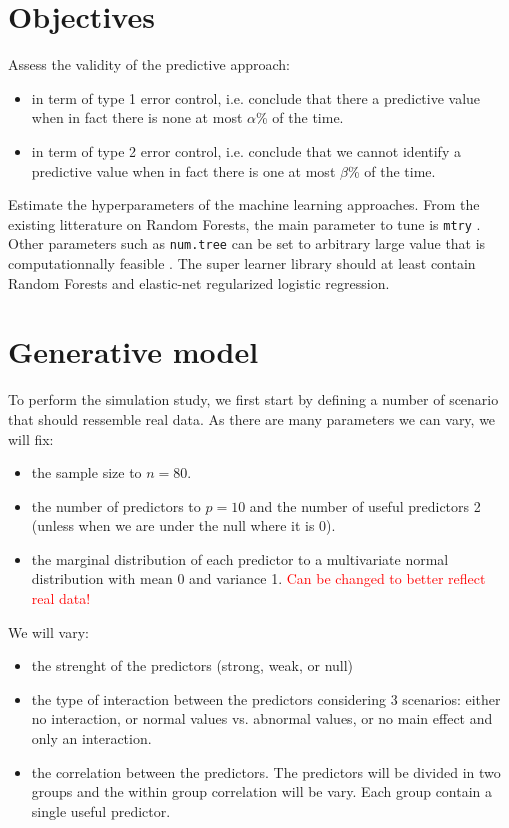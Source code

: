 \documentclass[12pt]{article}
\begin{document}
\section{Objectives}
\label{sec:org1970248}

Assess the validity of the predictive approach:
\begin{itemize}
\item in term of type 1 error control, i.e. conclude that there a predictive
value when in fact there is none at most \(\alpha\)\% of the time.
\item in term of type 2 error control, i.e. conclude that we cannot identify a predictive
value when in fact there is one at most \(\beta\)\% of the time.
\end{itemize}

\bigskip

Estimate the hyperparameters of the machine learning
approaches. \newline From the existing litterature on Random Forests,
the main parameter to tune is \texttt{mtry}
\cite{probst2019hyperparameters}. Other parameters such as \texttt{num.tree}
can be set to arbitrary large value that is computationnally feasible
\citep{probst2017tune}.  \newline The super learner library should at
least contain Random Forests and elastic-net regularized logistic
regression.

\section{Generative model}
\label{sec:org0603173}

To perform the simulation study, we first start by defining a number
of scenario that should ressemble real data. As there are many parameters we can vary, we will fix:
\begin{itemize}
\item the sample size to \(n=80\).
\item the number of predictors to \(p=10\) and the number of useful
predictors 2 (unless when we are under the null where it is 0).
\item the marginal distribution of each predictor to a multivariate normal
distribution with mean 0 and variance 1. \textcolor{red}{Can
  be changed to better reflect real data!}
\end{itemize}
We will vary:
\begin{itemize}
\item the strenght of the predictors (strong, weak, or null)
\item the type of interaction between the predictors considering 3
scenarios: either no interaction, or normal values vs. abnormal
values, or no main effect and only an interaction.
\item the correlation between the predictors. The predictors will be
divided in two groups and the within group correlation will be
vary. Each group contain a single useful predictor.
\end{itemize}
\end{document}
